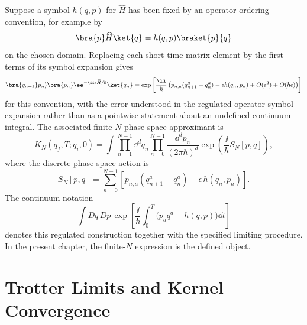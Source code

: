 \begin{center}
\end{center}

Suppose a symbol \(h(q,p)\) for \(\widehat H\) has been fixed by an operator
ordering convention, for example by
\[
  \bra{p}\widehat H\ket{q}=h(q,p)\braket{p}{q}
\]
on the chosen domain.  Replacing each short-time matrix element by the first
terms of its symbol expansion gives
\[
  \bra{q_{n+1}}p_n\rangle
  \bra{p_n}\ee^{-\ii\epsilon\widehat H/\hbar}\ket{q_n}
  =
  \exp\left[
    \frac{\ii}{\hbar}
    \left(
      p_{n,a}(q_{n+1}^a-q_n^a)
      -\epsilon h(q_n,p_n)
      +O(\epsilon^2)+O(\hbar\epsilon)
    \right)
  \right]
\]
for this convention, with the error understood in the regulated
operator-symbol expansion rather than as a pointwise statement about an
undefined continuum integral.  The associated finite-\(N\) phase-space
approximant is
\[
  K_N(q_f,T;q_i,0)
  =
  \int
  \prod_{n=1}^{N-1}\dd^dq_n
  \prod_{n=0}^{N-1}\frac{\dd^dp_n}{(2\pi\hbar)^d}
  \exp\left(\frac{\ii}{\hbar}S_N[p,q]\right),
\]
where the discrete phase-space action is
\[
  S_N[p,q]
  =
  \sum_{n=0}^{N-1}
  \left[
    p_{n,a}(q_{n+1}^a-q_n^a)
    -\epsilon\,h(q_n,p_n)
  \right].
\]
The continuum notation
\[
  \int Dq\,Dp\,
  \exp\left[
    \frac{\ii}{\hbar}\int_0^T
    \bigl(p_a\dot q^a-h(q,p)\bigr)\dd t
  \right]
\]
denotes this regulated construction together with the specified limiting
procedure. In the present chapter, the finite-\(N\) expression is the defined
object.

\section{Trotter Limits and Kernel Convergence}

